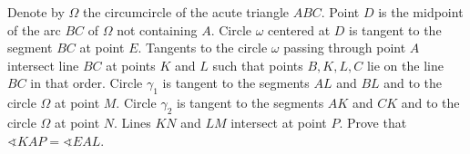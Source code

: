 Denote by $\Omega$ the circumcircle of the acute triangle $ABC$. Point $D$ is the midpoint of the arc $BC$ of $\Omega$ not containing $A$. Circle $\omega$ centered at $D$ is tangent to the segment $BC$ at point $E$. Tangents to the circle $\omega$ passing through point $A$ intersect line $BC$ at points $K$ and $L$ such that points $B, K, L, C$ lie on the line $BC$ in that order. Circle $\gamma_1$ is tangent to the segments $AL$ and $BL$ and to the circle $\Omega$ at point $M$. Circle $\gamma_2$ is tangent to the segments $AK$ and $CK$ and to the circle $\Omega$ at point $N$. Lines $KN$ and $LM$ intersect at point $P$. Prove that $\sphericalangle KAP = \sphericalangle EAL$.